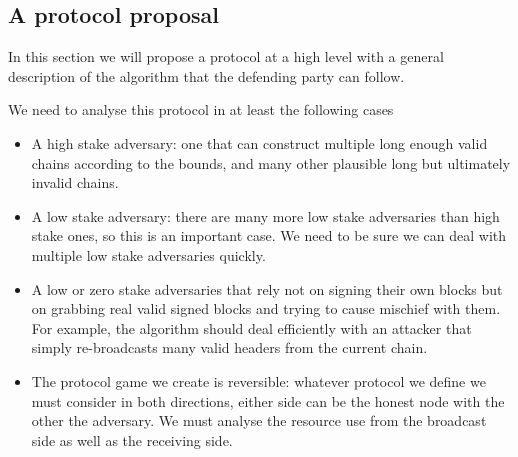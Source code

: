 \documentclass{article}
\theoremstyle{definition}{
  \newtheorem{lemma}{Lemma}[section] %
  \newtheorem{definition}[lemma]{Definition}
}
\theoremstyle{theorem}{
  \newtheorem{invariant}[lemma]{Invariant}
  \newtheorem{proofobligation}[lemma]{Proof Obligation}
}
\numberwithin{equation}{lemma}
\begin{document}
\subsection{A protocol proposal}

In this section we will propose a protocol at a high level with a general
description of the algorithm that the defending party can follow.

We need to analyse this protocol in at least the following cases
\begin{itemize}
\item A high stake adversary: one that can construct multiple long enough valid
chains according to the bounds, and many other plausible long but ultimately
invalid chains.
\item A low stake adversary: there are many more low stake adversaries than
high stake ones, so this is an important case. We need to be sure we can deal
with multiple low stake adversaries quickly.
\item A low or zero stake adversaries that rely not on signing their own blocks
but on grabbing real valid signed blocks and trying to cause mischief with
them. For example, the algorithm should deal efficiently with an attacker that
simply re-broadcasts many valid headers from the current chain.
\item The protocol game we create is reversible: whatever protocol we define
we must consider in both directions, either side can be the honest node with
the other the adversary. We must analyse the resource use from the broadcast
side as well as the receiving side.
\end{itemize}
\end{document}
